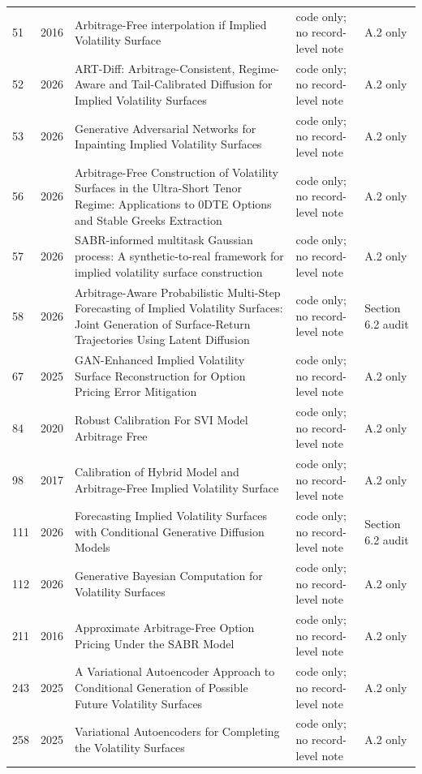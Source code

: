 \documentclass[11pt]{article}
\begin{document}
\begin{longtable}{@{}p{}p{}p{}p{}p{}@{}}
51 & 2016 & Arbitrage-Free interpolation if Implied Volatility Surface & code only; no record-level note & A.2 only \\
52 & 2026 & ART-Diff: Arbitrage-Consistent, Regime-Aware and Tail-Calibrated Diffusion for Implied Volatility Surfaces & code only; no record-level note & A.2 only \\
53 & 2026 & Generative Adversarial Networks for Inpainting Implied Volatility Surfaces & code only; no record-level note & A.2 only \\
56 & 2026 & Arbitrage-Free Construction of Volatility Surfaces in the Ultra-Short Tenor Regime: Applications to 0DTE Options and Stable Greeks Extraction & code only; no record-level note & A.2 only \\
57 & 2026 & SABR-informed multitask Gaussian process: A synthetic-to-real framework for implied volatility surface construction & code only; no record-level note & A.2 only \\
58 & 2026 & Arbitrage-Aware Probabilistic Multi-Step Forecasting of Implied Volatility Surfaces: Joint Generation of Surface-Return Trajectories Using Latent Diffusion & code only; no record-level note & Section 6.2 audit \\
67 & 2025 & GAN-Enhanced Implied Volatility Surface Reconstruction for Option Pricing Error Mitigation & code only; no record-level note & A.2 only \\
84 & 2020 & Robust Calibration For SVI Model Arbitrage Free & code only; no record-level note & A.2 only \\
98 & 2017 & Calibration of Hybrid Model and Arbitrage-Free Implied Volatility Surface & code only; no record-level note & A.2 only \\
111 & 2026 & Forecasting Implied Volatility Surfaces with Conditional Generative Diffusion Models & code only; no record-level note & Section 6.2 audit \\
112 & 2026 & Generative Bayesian Computation for Volatility Surfaces & code only; no record-level note & A.2 only \\
211 & 2016 & Approximate Arbitrage-Free Option Pricing Under the SABR Model & code only; no record-level note & A.2 only \\
243 & 2025 & A Variational Autoencoder Approach to Conditional Generation of Possible Future Volatility Surfaces & code only; no record-level note & A.2 only \\
258 & 2025 & Variational Autoencoders for Completing the Volatility Surfaces & code only; no record-level note & A.2 only \\

\end{longtable}
\end{document}
